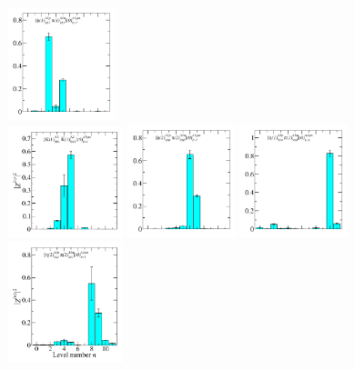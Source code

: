 \begin{figure}
  \includegraphics[width=0.28\textwidth]{figures/spectrum_a1gm/no_tq/zfactors/zfactor_isotriplet_phi_pion-A1gm_1-P001-A2p-SS_1-P00-1-A2m-SS_1.pdf}\\
  \includegraphics[width=0.3\textwidth]{figures/spectrum_a1gm/no_tq/zfactors/zfactor_isotriplet_kaon_kbar-A1gm_1-P001-A2-SS_1-P00-1-A2-SS_1.pdf}
  \includegraphics[width=0.28\textwidth]{figures/spectrum_a1gm/no_tq/zfactors/zfactor_isotriplet_phi_pion-A1gm_1-P011-A2p-SS_0-P0-1-1-A2m-SS_0.pdf}
  \includegraphics[width=0.28\textwidth]{figures/spectrum_a1gm/no_tq/zfactors/zfactor_isotriplet_eta_pion-A1gm_1-P001-A2p-SS_0-P00-1-A2m-SS_0.pdf}\\
  \includegraphics[width=0.3\textwidth]{figures/spectrum_a1gm/no_tq/zfactors/zfactor_isotriplet_eta_pion-A1gm_1-P011-A2p-SS_1-P0-1-1-A2m-SS_1.pdf}

\end{figure}
